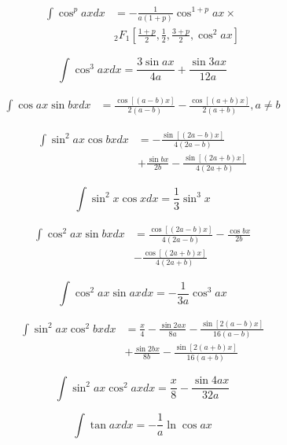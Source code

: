 \documentclass[11pt,twoside]{article}
\begin{document}
\begin{multicols}{3}
\begin{footnotesize}
\begin{align}
\int \cos^p ax dx & = -\frac{1}{a(1+p)}{\cos^{1+p} ax} \times
\nonumber \\ &
{_2F_1}\left[
\frac{1+p}{2}, \frac{1}{2}, \frac{3+p}{2}, \cos^2 ax
\right]
\end{align}

\begin{equation}
\int \cos^3 ax dx = \frac{3 \sin ax}{4a}+\frac{ \sin 3ax}{12a}
\end{equation}

\begin{align}
\int \cos ax \sin bx dx &= \frac{\cos[(a-b) x]}{2(a-b)} -
 \frac{\cos[(a+b)x]}{2(a+b)} , a\ne b
\end{align}

\begin{align}
\int \sin^2 ax \cos bx dx &=
-\frac{\sin[(2a-b)x]}{4(2a-b)} \nonumber \\ &
+ \frac{\sin bx}{2b}
- \frac{\sin[(2a+b)x]}{4(2a+b)}
\end{align}

\begin{equation}
\int \sin^2 x \cos x dx = \frac{1}{3} \sin^3 x
\end{equation}

\begin{align}
\int \cos^2 ax \sin bx dx &= \frac{\cos[(2a-b)x]}{4(2a-b)}
- \frac{\cos bx}{2b}
\nonumber \\ &
 - \frac{\cos[(2a+b)x]}{4(2a+b)}
\end{align}

\begin{equation}
\int \cos^2 ax \sin ax dx = -\frac{1}{3a}\cos^3{ax}
\end{equation}

\begin{align}
\int \sin^2 ax \cos^2 bx dx &= \frac{x}{4}
-\frac{\sin 2ax}{8a}-
\frac{\sin[2(a-b)x]}{16(a-b)}
\nonumber \\ &
+\frac{\sin 2bx}{8b}-
\frac{\sin[2(a+b)x]}{16(a+b)}
\end{align}

\begin{equation}
\int \sin^2 ax \cos^2 ax dx = \frac{x}{8}-\frac{\sin 4ax}{32a}
\end{equation}

\begin{equation}
\int \tan ax dx = -\frac{1}{a} \ln \cos ax
\end{equation}


\end{footnotesize}
\end{multicols}
\end{document}

